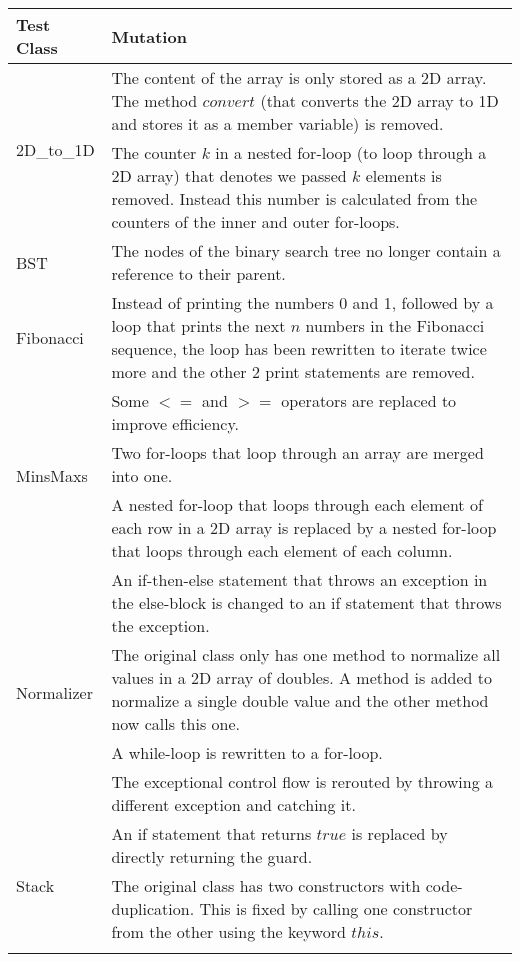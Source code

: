 \documentclass[a4paper, fleqn]{article}
\begin{document}
\begin{table}
    \begin{tabular}{ | p{2.7cm} | p{8.64cm} |}
    \hline
    Test Class &  Mutation \\ \hline
    \multirow{2}{*}{2D\_to\_1D} & The content of the array is only stored as a 2D array. The method $convert$ (that converts the 2D array to 1D and stores it as a member variable) is removed. \\ \cline{2-2}
 & The counter $k$ in a nested for-loop (to loop through a 2D array) that denotes we passed $k$ elements is removed. Instead this number is calculated from the counters of the inner and outer for-loops. \\ \hline
    BST & The nodes of the binary search tree no longer contain a reference to their parent. \\ \hline
    Fibonacci & Instead of printing the numbers 0 and 1, followed by a loop that prints the next $n$ numbers in the Fibonacci sequence, the loop has been rewritten to iterate twice more and the other 2 print statements are removed. \\ \hline
 \multirow{3}{*}{MinsMaxs} & Some $<=$ and $>=$ operators are replaced to improve efficiency. \\ \cline{2-2}
 & Two for-loops that loop through an array are merged into one. \\ \cline{2-2}
 & A nested for-loop that loops through each element of each row in a 2D array is replaced by a nested for-loop that loops through each element of each column. \\ \hline
    \multirow{4}{*}{Normalizer} & An if-then-else statement that throws an exception in the else-block is changed to an if statement that throws the exception. \\ \cline{2-2}
 & The original class only has one method to normalize all values in a 2D array of doubles. A method is added to normalize a single double value and the other method now calls this one. \\ \cline{2-2}
 & A while-loop is rewritten to a for-loop. \\ \cline{2-2}
 & The exceptional control flow is rerouted by throwing a different exception and catching it. \\ \hline
    \multirow{3}{*}{Stack} & An if statement that returns $true$ is replaced by directly returning the guard. \\ \cline{2-2}
 & The original class has two constructors with code-duplication. This is fixed by calling one constructor from the other using the keyword $this$. \\ \cline{2-2}

\end{tabular}
\end{table}
\end{document}
